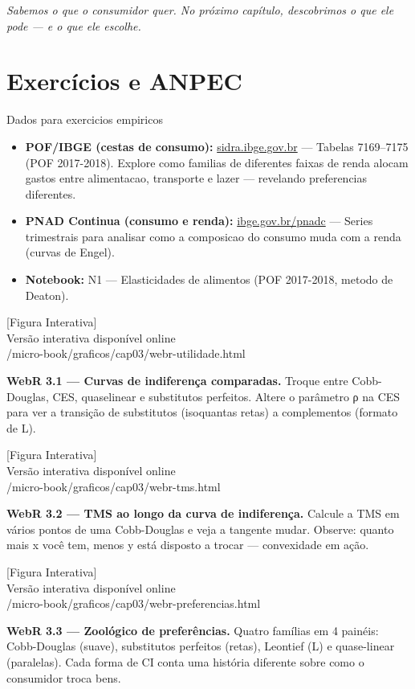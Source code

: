 \documentclass[11pt,twoside,openright]{book}
\newcommand{\figurePlaceholder}[1]{%
  \begin{center}
    \begin{tcolorbox}[
      width=0.85\textwidth,
      colback=graybg,
      colframe=gray,
      boxrule=0.5pt,
      arc=2pt,
      halign=center,
      valign=center,
      height=5cm
    ]
      \centering
      \vfill
      {\sffamily\color{gray}\large [Figura Interativa]}\\[6pt]
      {\sffamily\small\color{gray} Versão interativa disponível online}\\[4pt]
      {\ttfamily\tiny\color{gray} #1}
      \vfill
    \end{tcolorbox}
  \end{center}
}
\providecommand{\tightlist}{\setlength{\itemsep}{0pt}\setlength{\parskip}{0pt}}
\begin{document}
\emph{Sabemos o que o consumidor quer. No próximo capítulo, descobrimos
o que ele pode --- e o que ele escolhe.}

\chapter{Exercícios e ANPEC}\label{exercuxedcios-e-anpec}

\begin{tipbox}{Dados para exercicios empiricos}

\begin{itemize}
\tightlist
\item
  \textbf{POF/IBGE (cestas de consumo):}
  \href{https://sidra.ibge.gov.br}{sidra.ibge.gov.br} --- Tabelas
  7169--7175 (POF 2017-2018). Explore como familias de diferentes faixas
  de renda alocam gastos entre alimentacao, transporte e lazer ---
  revelando preferencias diferentes.
\item
  \textbf{PNAD Continua (consumo e renda):}
  \href{https://www.ibge.gov.br/estatisticas/sociais/trabalho/9171-pesquisa-nacional-por-amostra-de-domicilios-continua-mensal.html}{ibge.gov.br/pnadc}
  --- Series trimestrais para analisar como a composicao do consumo muda
  com a renda (curvas de Engel).
\item
  \textbf{Notebook:} N1 --- Elasticidades de alimentos (POF 2017-2018,
  metodo de Deaton).
\end{itemize}

\end{tipbox}

\figurePlaceholder{/micro-book/graficos/cap03/webr-utilidade.html}

\textbf{WebR 3.1 --- Curvas de indiferença comparadas.} Troque entre
Cobb-Douglas, CES, quaselinear e substitutos perfeitos. Altere o
parâmetro ρ na CES para ver a transição de substitutos (isoquantas
retas) a complementos (formato de L).

\figurePlaceholder{/micro-book/graficos/cap03/webr-tms.html}

\textbf{WebR 3.2 --- TMS ao longo da curva de indiferença.} Calcule a
TMS em vários pontos de uma Cobb-Douglas e veja a tangente mudar.
Observe: quanto mais x você tem, menos y está disposto a trocar ---
convexidade em ação.

\figurePlaceholder{/micro-book/graficos/cap03/webr-preferencias.html}

\textbf{WebR 3.3 --- Zoológico de preferências.} Quatro famílias em 4
painéis: Cobb-Douglas (suave), substitutos perfeitos (retas), Leontief
(L) e quase-linear (paralelas). Cada forma de CI conta uma história
diferente sobre como o consumidor troca bens.
\end{document}
